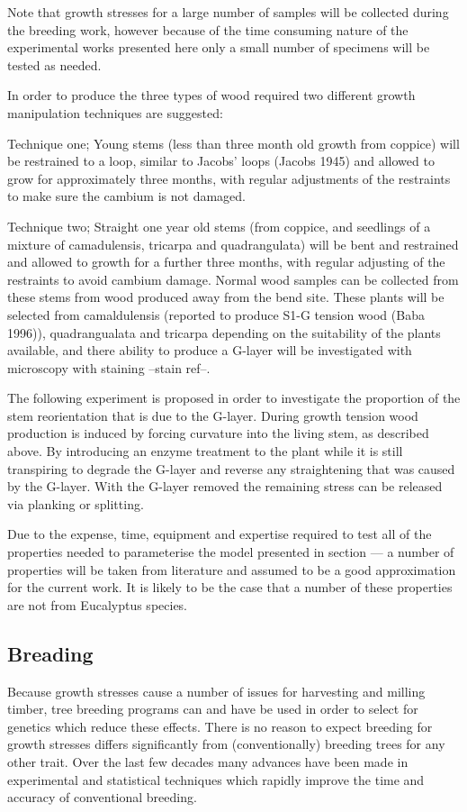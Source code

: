 \documentclass{article}
\begin{document}
Note that growth stresses for a large number of samples will be collected during
the breeding work, however because of the time consuming nature of the
experimental works presented here only a small number of specimens will be
tested as needed.

In order to produce the three types of wood required two different growth
manipulation techniques are suggested:

Technique one; Young stems (less than three month old growth from coppice) will
be restrained to a loop, similar to Jacobs' loops (Jacobs 1945) and allowed to
grow for approximately three months, with regular adjustments of the restraints
to make sure the cambium is not damaged.

Technique two; Straight one year old stems (from coppice, and seedlings of a
mixture of camadulensis, tricarpa and quadrangulata) will be bent and restrained
and allowed to growth for a further three months, with regular adjusting of the
restraints to avoid cambium damage. Normal wood samples can be collected from
these stems from wood produced away from the bend site. These plants will be
selected from camaldulensis (reported to produce S1-G tension wood (Baba 1996)),
quadrangualata and tricarpa depending on the suitability of the plants
available, and there ability to produce a G-layer will be investigated with
microscopy with staining --stain ref--.

The following experiment is proposed in order to investigate the proportion of
the stem reorientation that is due to the G-layer. During growth tension wood
production is induced by forcing curvature into the living stem, as described
above. By introducing an enzyme treatment to the plant while it is still
transpiring to degrade the G-layer and reverse any straightening that was caused
by the G-layer. With the G-layer removed the remaining stress can be released
via planking or splitting.

Due to the expense, time, equipment and expertise required to test all of the
properties needed to parameterise the model presented in section --- a number of
properties will be taken from literature and assumed to be a good approximation
for the current work. It is likely to be the case that a number of these
properties are not from Eucalyptus species.

\subsection{Breading}
Because growth stresses cause a number of issues for harvesting and milling
timber, tree breeding programs can and have be used in order to select for
genetics which reduce these effects. There is no reason to expect  breeding for
growth stresses differs significantly from (conventionally) breeding trees for
any other trait. Over the last few decades many advances have been made in
experimental and statistical techniques which rapidly improve the time and
accuracy of conventional breeding.
\end{document}
